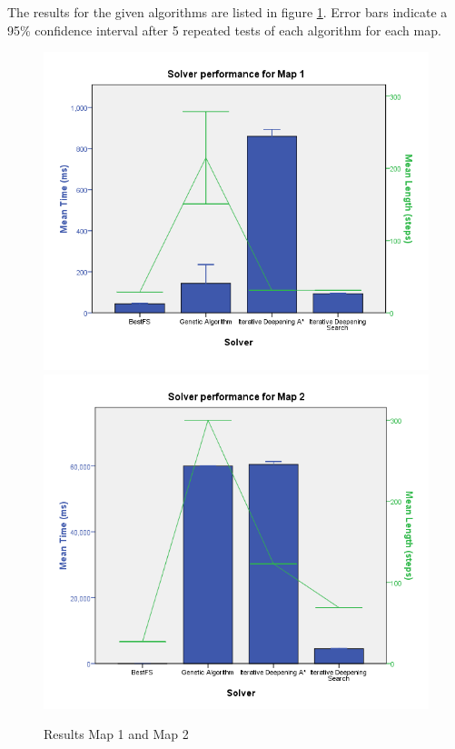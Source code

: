 The results for the given algorithms are listed in figure \ref{fig:result1}. Error bars indicate a 95\% confidence interval after 5 repeated tests of each algorithm for each map. 

\begin{figure}
\center
\includegraphics[width=\columnwidth]{./images/performance_map27.png}\includegraphics[width=\columnwidth]{./images/performance_map28.png}
\caption{Results Map 1 and Map 2}
\label{fig:result1}
\end{figure}


